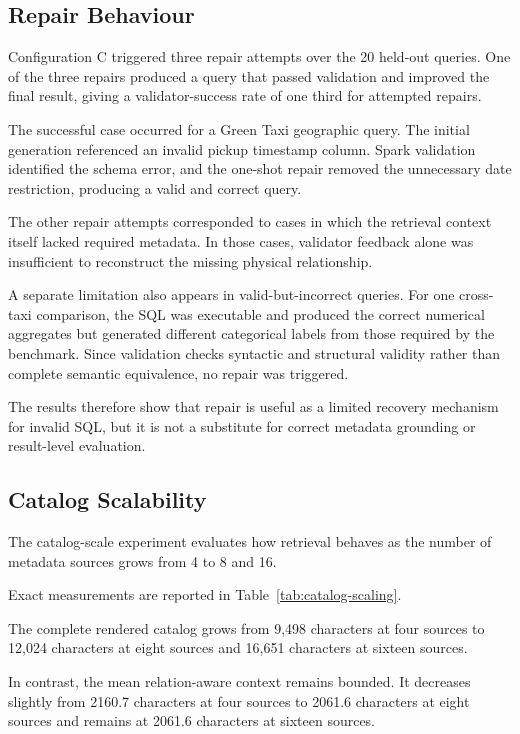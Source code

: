 \subsection{Repair Behaviour}

Configuration C triggered three repair attempts over the 20 held-out queries.
One of the three repairs produced a query that passed validation and improved
the final result, giving a validator-success rate of one third for attempted
repairs.

The successful case occurred for a Green Taxi geographic query. The initial
generation referenced an invalid pickup timestamp column. Spark validation
identified the schema error, and the one-shot repair removed the unnecessary
date restriction, producing a valid and correct query.

The other repair attempts corresponded to cases in which the retrieval context
itself lacked required metadata. In those cases, validator feedback alone was
insufficient to reconstruct the missing physical relationship.

A separate limitation also appears in valid-but-incorrect queries. For one
cross-taxi comparison, the SQL was executable and produced the correct
numerical aggregates but generated different categorical labels from those
required by the benchmark. Since validation checks syntactic and structural
validity rather than complete semantic equivalence, no repair was triggered.

The results therefore show that repair is useful as a limited recovery
mechanism for invalid SQL, but it is not a substitute for correct metadata
grounding or result-level evaluation.


\subsection{Catalog Scalability}

The catalog-scale experiment evaluates how retrieval behaves as the number of
metadata sources grows from 4 to 8 and 16.

Exact measurements are reported in Table~\ref{tab:catalog-scaling}.



The complete rendered catalog grows from 9,498 characters at four sources to
12,024 characters at eight sources and 16,651 characters at sixteen sources.

In contrast, the mean relation-aware context remains bounded. It decreases
slightly from 2160.7 characters at four sources to 2061.6 characters at eight
sources and remains at 2061.6 characters at sixteen sources.

